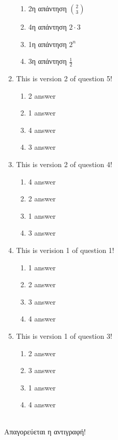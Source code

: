 \documentclass[a4paper, 11pt]{article}
\begin{document}
\begin{enumerate}
\begin{enumerate}[(1)]
    \item 2η απάντηση $\binom{2}{3}$
    \item 4η απάντηση $2\cdot 3$
    \item 1η απάντηση $2^n$
    \item 3η απάντηση $\frac{1}{2}$
\end{enumerate}
\item This is version 2 of question 5!
\begin{enumerate}[(1)]
    \item 2 answer
    \item 1 answer
    \item 4 answer
    \item 3 answer
\end{enumerate}
\item This is version 2 of question 4!
\begin{enumerate}[(1)]
    \item 4 answer
    \item 2 answer
    \item 1 answer
    \item 3 answer
\end{enumerate}
\item This is verision 1 of question 1!
\begin{enumerate}[(1)]
    \item 1 answer
    \item 2 answer
    \item 3 answer
    \item 4 answer
\end{enumerate}
\item This is version 1 of question 3!
\begin{enumerate}[(1)]
    \item 2 answer
    \item 3 answer
    \item 1 answer
    \item 4 answer
\end{enumerate}
\end{enumerate}
\hrulefill \\ 

Απαγορεύεται η αντιγραφή! 

\newpage 
\end{document}

